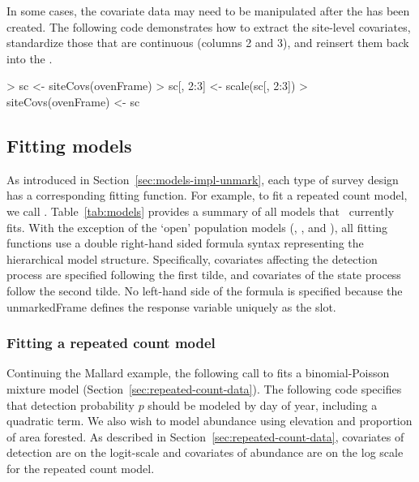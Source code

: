 \documentclass[article,shortnames]{jss}
\newcommand{\um}{\pkg{unmarked}}
\begin{document}
{In some cases, the covariate data may need to be manipulated after the 
 has been created. The following code demonstrates 
how to extract the site-level covariates, standardize those that are 
continuous (columns 2 and 3), and reinsert them back into the 
.

\begin{Schunk}
\begin{Sinput}
> sc <- siteCovs(ovenFrame)
> sc[, 2:3] <- scale(sc[, 2:3])
> siteCovs(ovenFrame) <- sc
\end{Sinput}
\end{Schunk}



\subsection{Fitting models}
\label{sec:fitting-models}

As introduced in Section~\ref{sec:models-impl-unmark}, each type of 
survey design 
has a corresponding fitting function.  For example, to fit a repeated count
model, we call .  Table~\ref{tab:models} provides a
summary of all models that \um\ currently fits.  With the exception of the 
`open' population models (, , and 
), all fitting functions use a double right-hand sided 
formula syntax representing the hierarchical model structure.  
Specifically, covariates affecting the detection process are specified 
following the first tilde, and covariates of the state process follow the 
second tilde. No left-hand side of the formula is specified because the 
unmarkedFrame defines the response variable uniquely as the  slot.

\subsubsection{Fitting a repeated count model}

Continuing the Mallard example, the following call to  fits a 
binomial-Poisson mixture model (Section~\ref{sec:repeated-count-data}).  The 
following code specifies that detection probability $p$ should be modeled by 
day of year, including a quadratic term.  We also wish to model abundance 
using elevation and proportion of area forested.  As described in 
Section~\ref{sec:repeated-count-data}, covariates of detection are on the 
logit-scale and covariates of abundance are on the log scale for the 
repeated count model.

}
\end{document}
